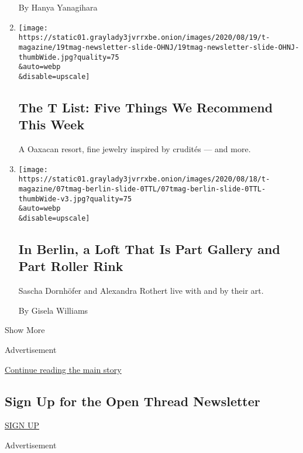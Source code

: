 \begin{enumerate}
  By Hanya Yanagihara
\item
  \href{/2020/08/20/t-magazine/monte-uzulu-vivanterre-emme-parsons.html}{}

  \texttt{[image: https://static01.graylady3jvrrxbe.onion/images/2020/08/19/t-magazine/19tmag-newsletter-slide-OHNJ/19tmag-newsletter-slide-OHNJ-thumbWide.jpg?quality=75\\\&auto=webp\\\&disable=upscale]}

  \hypertarget{the-t-list-five-things-we-recommend-this-week-2}{%
  \subsection{The T List: Five Things We Recommend This
  Week}\label{the-t-list-five-things-we-recommend-this-week-2}}

  A Oaxacan resort, fine jewelry inspired by crudités --- and more.
\item
  \href{/2020/08/19/t-magazine/berlin-infamous-skating-couple-design.html}{}

  \texttt{[image: https://static01.graylady3jvrrxbe.onion/images/2020/08/18/t-magazine/07tmag-berlin-slide-0TTL/07tmag-berlin-slide-0TTL-thumbWide-v3.jpg?quality=75\\\&auto=webp\\\&disable=upscale]}

  \hypertarget{in-berlin-a-loft-that-is-part-gallery-and-part-roller-rink}{%
  \subsection{In Berlin, a Loft That Is Part Gallery and Part Roller
  Rink}\label{in-berlin-a-loft-that-is-part-gallery-and-part-roller-rink}}

  Sascha Dornhöfer and Alexandra Rothert live with and by their art.

  By Gisela Williams
\end{enumerate}

Show More

Advertisement

\protect\hyperlink{after-mid2}{Continue reading the main story}

\hypertarget{sign-up-for-the-open-thread-newsletter}{%
\subsection{Sign Up for the Open Thread
Newsletter}\label{sign-up-for-the-open-thread-newsletter}}

\href{/newsletters/signup/TZ}{SIGN UP}

Advertisement

